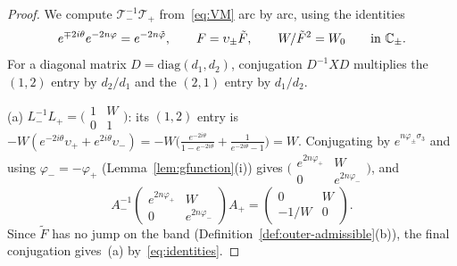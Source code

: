 \begin{proof}
We compute $\mathcal T_-^{-1}\mathcal T_+$ from~\eqref{eq:VM} arc by arc, using the identities
\begin{equation}\label{eq:identities}
  e^{\mp2i\theta}e^{-2n\varphi}=e^{-2n\tilde\varphi},\qquad F=\upsilon_\pm\tilde F,\qquad W/\tilde F^2=W_0\qquad\text{in }\mathbb{C}_\pm .
\end{equation}
For a diagonal matrix $D=\mathrm{diag}(d_1,d_2)$, conjugation $D^{-1}XD$ multiplies the $(1,2)$ entry by $d_2/d_1$ and
the $(2,1)$ entry by $d_1/d_2$.

(a) $L_-^{-1}L_+=\bigl(\begin{smallmatrix}1&W\\0&1\end{smallmatrix}\bigr)$: its $(1,2)$ entry is
$-W(e^{-2i\theta}\upsilon_++e^{2i\theta}\upsilon_-)=-W\bigl(\frac{e^{-2i\theta}}{1-e^{-2i\theta}}+\frac1{e^{-2i\theta}-1}\bigr)=W$.
Conjugating by $e^{n\varphi_\pm\sigma_3}$ and using $\varphi_-=-\varphi_+$ (Lemma~\ref{lem:gfunction}(i)) gives
$\bigl(\begin{smallmatrix}e^{2n\varphi_+}&W\\0&e^{2n\varphi_-}\end{smallmatrix}\bigr)$, and
\[
  A_-^{-1}\begin{pmatrix}e^{2n\varphi_+}&W\\0&e^{2n\varphi_-}\end{pmatrix}A_+=\begin{pmatrix}0&W\\-1/W&0\end{pmatrix}.
\]
Since $\tilde F$ has no jump on the band (Definition~\ref{def:outer-admissible}(b)), the final conjugation gives~(a)
by~\eqref{eq:identities}.


\end{proof}
